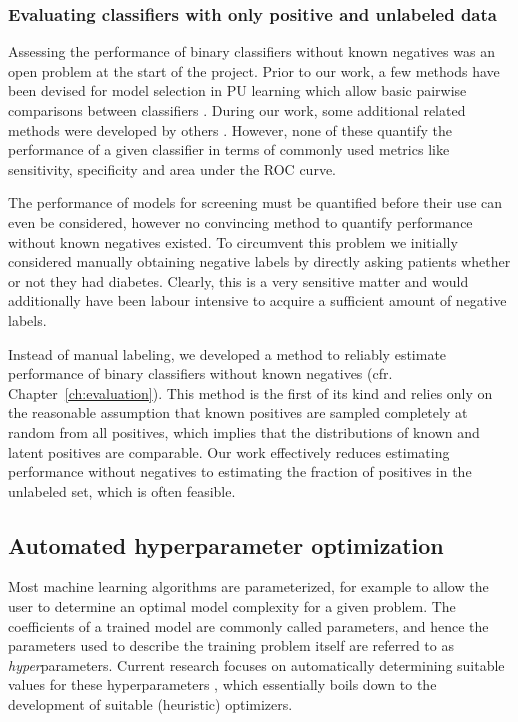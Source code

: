 \subsubsection{Evaluating classifiers with only positive and unlabeled data} 
Assessing the performance of binary classifiers without known negatives was an open problem at the start of the project. Prior to our work, a few methods have been devised for model selection in PU learning which allow basic pairwise comparisons between classifiers \citep{Lee03learningwith}. During our work, some additional related methods were developed by others \citep{sechidis2014statistical, hajizadeh2014evaluating}. However, none of these quantify the performance of a given classifier in terms of commonly used metrics like sensitivity, specificity and area under the ROC curve.

The performance of models for screening must be quantified before their use can even be considered, however no convincing method to quantify performance without known negatives existed. To circumvent this problem we initially considered manually obtaining negative labels by directly asking patients whether or not they had diabetes. Clearly, this is a very sensitive matter and would additionally have been labour intensive to acquire a sufficient amount of negative labels. 

Instead of manual labeling, we developed a method to reliably estimate performance of binary classifiers without known negatives (cfr. Chapter~\ref{ch:evaluation}). This method is the first of its kind and relies only on the reasonable assumption that known positives are sampled completely at random from all positives, which implies that the distributions of known and latent positives are comparable. Our work effectively reduces estimating performance without negatives to estimating the fraction of positives in the unlabeled set, which is often feasible.

\subsection{Automated hyperparameter optimization} \label{intro:tuning}
Most machine learning algorithms are parameterized, for example to allow the user to determine an optimal model complexity for a given problem. The coefficients of a trained model are commonly called parameters, and hence the parameters used to describe the training problem itself are referred to as \emph{hyper}parameters. Current research focuses on automatically determining suitable values for these hyperparameters \citep{hutter2009paramils, bergstra2011algorithms, snoek2012practical, bergstra2012random, bergstra2013hyperopt, eggensperger2013towards, thornton2013auto}, which essentially boils down to the development of suitable (heuristic) optimizers.

